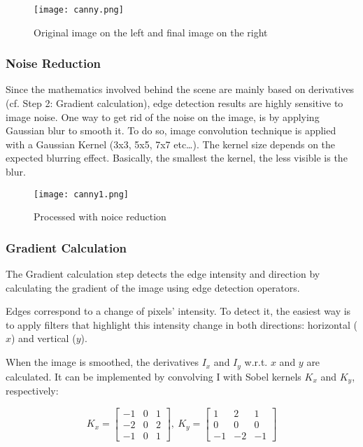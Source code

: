\documentclass[11pt]{article}
\begin{document}
\begin{figure}[hbt!]
    \centering
    \texttt{[image: canny.png]}
    \caption{Original image on the left and final image on the right}
\end{figure}

\subsubsection{Noise Reduction}
Since the mathematics involved behind the scene are mainly based on derivatives
(cf. Step 2: Gradient calculation),
edge detection results are highly sensitive to image noise.
One way to get rid of the noise on the image,
is by applying Gaussian blur to smooth it.
To do so, image convolution technique is applied with a
Gaussian Kernel (3x3, 5x5, 7x7 etc…).
The kernel size depends on the expected blurring effect.
Basically, the smallest the kernel, the less visible is the blur.
\begin{figure}[hbt!]
    \centering
    \texttt{[image: canny1.png]}
    \caption{Processed with noice reduction}
\end{figure}


\subsubsection{Gradient Calculation}
The Gradient calculation step detects the edge intensity and direction by calculating the gradient of the image using edge detection operators.
\begin{framed}
    \begin{center}
        Edges correspond to a change of pixels’ intensity. To detect it, the easiest way is to apply filters that highlight this intensity change in both directions: horizontal ($x$) and vertical ($y$).
    \end{center}
\end{framed}

When the image is smoothed, the derivatives $I_x$ and $I_y$ w.r.t. $x$ and $y$ are calculated. It can be implemented by convolving I with Sobel kernels $K_x$ and $K_y$, respectively:

$$K_x=\left[\begin{matrix}-1&0&1\\-2&0&2\\-1&0&1\end{matrix}\right],\ K_y=\left[\begin{matrix}1&2&1\\0&0&0\\-1&-2&-1\end{matrix}\right]$$
\end{document}
